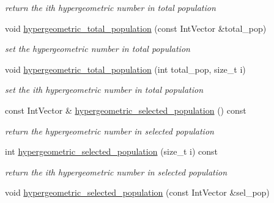 \begin{DoxyCompactItemize}
\begin{DoxyCompactList}\small\item\em return the ith hypergeometric number in total population \end{DoxyCompactList}\item 
void \hyperlink{classPecos_1_1AleatoryDistParams_ad660131a8f3898a2d234033361239986}{hypergeometric\+\_\+total\+\_\+population} (const Int\+Vector \&total\+\_\+pop)\label{classPecos_1_1AleatoryDistParams_ad660131a8f3898a2d234033361239986}

\begin{DoxyCompactList}\small\item\em set the hypergeometric number in total population \end{DoxyCompactList}\item 
void \hyperlink{classPecos_1_1AleatoryDistParams_a8f43e9fa920568dabe84fc2987b1f448}{hypergeometric\+\_\+total\+\_\+population} (int total\+\_\+pop, size\+\_\+t i)\label{classPecos_1_1AleatoryDistParams_a8f43e9fa920568dabe84fc2987b1f448}

\begin{DoxyCompactList}\small\item\em set the ith hypergeometric number in total population \end{DoxyCompactList}\item 
const Int\+Vector \& \hyperlink{classPecos_1_1AleatoryDistParams_a355db4caed2678241bf5a6d547066429}{hypergeometric\+\_\+selected\+\_\+population} () const \label{classPecos_1_1AleatoryDistParams_a355db4caed2678241bf5a6d547066429}

\begin{DoxyCompactList}\small\item\em return the hypergeometric number in selected population \end{DoxyCompactList}\item 
int \hyperlink{classPecos_1_1AleatoryDistParams_a4bdddc61ada002d57bba52dd911db675}{hypergeometric\+\_\+selected\+\_\+population} (size\+\_\+t i) const \label{classPecos_1_1AleatoryDistParams_a4bdddc61ada002d57bba52dd911db675}

\begin{DoxyCompactList}\small\item\em return the ith hypergeometric number in selected population \end{DoxyCompactList}\item 
void \hyperlink{classPecos_1_1AleatoryDistParams_a990a1ad399b3393ffeb1465d4042632e}{hypergeometric\+\_\+selected\+\_\+population} (const Int\+Vector \&sel\+\_\+pop)\label{classPecos_1_1AleatoryDistParams_a990a1ad399b3393ffeb1465d4042632e}


\end{DoxyCompactItemize}
